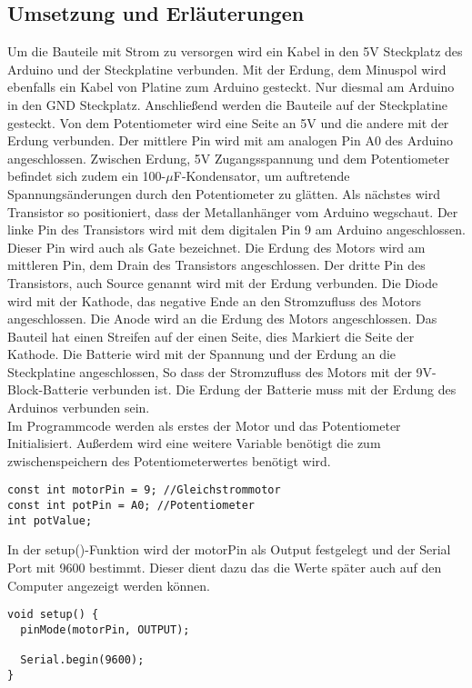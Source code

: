 \subsection{Umsetzung und Erläuterungen}
Um die Bauteile mit Strom zu versorgen wird ein Kabel in den 5V Steckplatz des Arduino und der Steckplatine verbunden. Mit der Erdung, dem Minuspol wird ebenfalls ein Kabel von Platine zum Arduino gesteckt. Nur diesmal am Arduino in den GND Steckplatz. Anschließend werden die Bauteile auf der Steckplatine gesteckt. Von dem Potentiometer wird eine Seite an 5V und die andere mit der Erdung verbunden. Der mittlere Pin wird mit am analogen Pin A0 des Arduino angeschlossen. Zwischen Erdung, 5V Zugangsspannung und dem Potentiometer befindet sich zudem ein 100-$\mu$F-Kondensator, um auftretende Spannungsänderungen durch den Potentiometer zu glätten. Als nächstes wird Transistor so positioniert, dass der Metallanhänger vom Arduino wegschaut. Der linke Pin des Transistors wird mit dem digitalen Pin 9 am Arduino angeschlossen. Dieser Pin wird auch als Gate bezeichnet. Die Erdung des Motors wird am mittleren Pin, dem Drain des Transistors angeschlossen. Der dritte Pin des Transistors, auch Source genannt wird mit der Erdung verbunden. Die Diode wird mit der Kathode, das negative Ende an den Stromzufluss des Motors angeschlossen. Die Anode wird an die Erdung des Motors angeschlossen. Das Bauteil hat einen Streifen auf der einen Seite, dies Markiert die Seite der Kathode. Die Batterie wird mit der Spannung und der Erdung an die Steckplatine angeschlossen, So dass der Stromzufluss des Motors mit der 9V-Block-Batterie verbunden ist. Die Erdung der Batterie muss mit der Erdung des Arduinos verbunden sein.
\\

Im Programmcode werden als erstes der Motor und das Potentiometer Initialisiert. Außerdem wird eine weitere Variable benötigt die zum zwischenspeichern des Potentiometerwertes benötigt wird.
\begin{lstlisting}[language=Arduino]
const int motorPin = 9; //Gleichstrommotor
const int potPin = A0; //Potentiometer
int potValue;
\end{lstlisting}

In der setup()-Funktion wird der motorPin als Output festgelegt und der Serial Port mit 9600 bestimmt. Dieser dient dazu das die Werte später auch auf den Computer angezeigt werden können.
\begin{lstlisting}[language=Arduino]
void setup() {
  pinMode(motorPin, OUTPUT);

  Serial.begin(9600);
}
\end{lstlisting}

